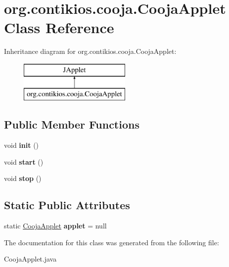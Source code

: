 \hypertarget{classorg_1_1contikios_1_1cooja_1_1CoojaApplet}{\section{org.\-contikios.\-cooja.\-Cooja\-Applet Class Reference}
\label{classorg_1_1contikios_1_1cooja_1_1CoojaApplet}
}
Inheritance diagram for org.\-contikios.\-cooja.\-Cooja\-Applet\-:\begin{figure}[H]
\begin{center}
\leavevmode
\includegraphics[height=2.000000cm]{classorg_1_1contikios_1_1cooja_1_1CoojaApplet}
\end{center}
\end{figure}
\subsection*{Public Member Functions}
\begin{DoxyCompactItemize}
\item 
\hypertarget{classorg_1_1contikios_1_1cooja_1_1CoojaApplet_abf6b23faf79a44175d19cfa2a30ec422}{void {\bfseries init} ()}\label{classorg_1_1contikios_1_1cooja_1_1CoojaApplet_abf6b23faf79a44175d19cfa2a30ec422}

\item 
\hypertarget{classorg_1_1contikios_1_1cooja_1_1CoojaApplet_a3ca680ed3ba46904685203e7427c26fb}{void {\bfseries start} ()}\label{classorg_1_1contikios_1_1cooja_1_1CoojaApplet_a3ca680ed3ba46904685203e7427c26fb}

\item 
\hypertarget{classorg_1_1contikios_1_1cooja_1_1CoojaApplet_a0b8fc2c632090032f84d3aa4470448e1}{void {\bfseries stop} ()}\label{classorg_1_1contikios_1_1cooja_1_1CoojaApplet_a0b8fc2c632090032f84d3aa4470448e1}

\end{DoxyCompactItemize}
\subsection*{Static Public Attributes}
\begin{DoxyCompactItemize}
\item 
\hypertarget{classorg_1_1contikios_1_1cooja_1_1CoojaApplet_ab6c49af9fc5cea3979fe1ad5c255e7cf}{static \hyperlink{classorg_1_1contikios_1_1cooja_1_1CoojaApplet}{Cooja\-Applet} {\bfseries applet} = null}\label{classorg_1_1contikios_1_1cooja_1_1CoojaApplet_ab6c49af9fc5cea3979fe1ad5c255e7cf}

\end{DoxyCompactItemize}


The documentation for this class was generated from the following file\-:\begin{DoxyCompactItemize}
\item 
Cooja\-Applet.\-java\end{DoxyCompactItemize}

